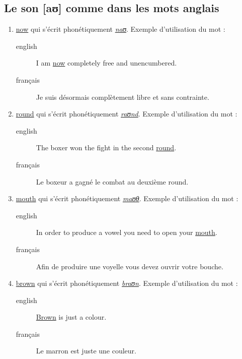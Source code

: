 \subsection{Le son [aʊ] comme dans les mots anglais}
\label{sec:org729933e}
\begin{enumerate}
\item \href{http://www.wordreference.com/enfr/now}{now} qui s'écrit phonétiquement \href{https://en.oxforddictionaries.com/definition/now}{\emph{naʊ}}. Exemple d'utilisation du mot :
\begin{description}
\item[{english}] \textenglish{I am \href{https://youtu.be/xcpxjx2fy\_E}{now} completely free and unencumbered.}
\item[{français}] Je suis désormais complètement libre et sans contrainte.
\end{description}
\item \href{http://www.wordreference.com/enfr/round}{round} qui s'écrit phonétiquement \href{https://en.oxforddictionaries.com/definition/round}{\emph{raʊnd}}. Exemple d'utilisation du mot :
\begin{description}
\item[{english}] \textenglish{The boxer won the fight in the second \href{https://youtu.be/oGTBax-Cu4Q}{round}.}
\item[{français}] Le boxeur a gagné le combat au deuxième round.
\end{description}
\item \href{http://www.wordreference.com/enfr/mouth}{mouth} qui s'écrit phonétiquement \href{https://en.oxforddictionaries.com/definition/mouth}{\emph{maʊθ}}. Exemple d'utilisation du mot :
\begin{description}
\item[{english}] \textenglish{In order to produce a vowel you need to open your
\href{https://youtu.be/kkDHKSNrJ5g}{mouth}.}
\item[{français}] Afin de produire une voyelle vous devez ouvrir votre
bouche.
\end{description}
\item \href{http://www.wordreference.com/enfr/brown}{brown} qui s'écrit phonétiquement \href{https://en.oxforddictionaries.com/definition/brown}{\emph{braʊn}}. Exemple d'utilisation du mot :
\begin{description}
\item[{english}] \textenglish{\href{https://youtu.be/OwTXBBU0JLo}{Brown} is just a colour.}
\item[{français}] Le marron est juste une couleur.
\end{description}
\end{enumerate}

